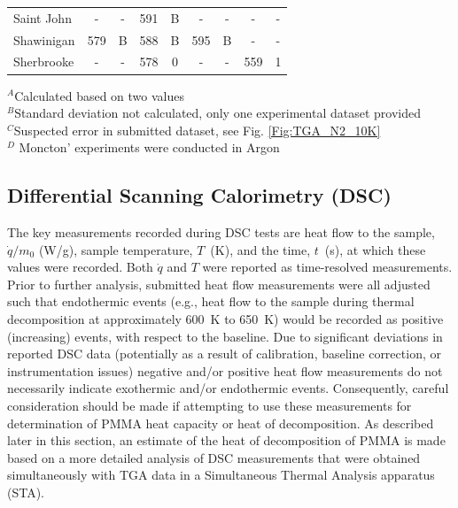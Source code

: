 \documentclass{book}
\begin{document}
\begin{table}[p]
\begin{center}
\begin{tabular}{|l|cc|cc|cc|cc|}
Saint John              & -           & -               & 591            & B                & -          & -                 & -           & -                     \\
Shawinigan              & 579         & B               & 588            & B                & 595        & B                 & -           & -                     \\
Sherbrooke              & -           & -               & 578            & 0                & -          & -                 & 559         & 1                     \\  \hline
\end{tabular}
\end{center}
$^A$Calculated based on two values \\
$^B$Standard deviation not calculated, only one experimental dataset provided \\
$^C$Suspected error in submitted dataset, see Fig. \ref{Fig:TGA_N2_10K} \\
$^D$ Moncton' experiments were conducted in Argon
\end{table}


\newpage
\subsection{Differential Scanning Calorimetry (DSC)}

The key measurements recorded during DSC tests are heat flow to the sample, $\dot{q}/m_0$ (W/g), sample temperature, $T$~(K), and the time, $t$~(s), at which these values were recorded.  Both $\dot{q}$ and $T$ were reported as time-resolved measurements. Prior to further analysis, submitted heat flow measurements were all adjusted such that endothermic events (e.g., heat flow to the sample during thermal decomposition at approximately 600~K to 650~K) would be recorded as positive (increasing) events, with respect to the baseline. Due to significant deviations in reported DSC data (potentially as a result of calibration, baseline correction, or instrumentation issues) negative and/or positive heat flow measurements do not necessarily indicate exothermic and/or endothermic events. Consequently, careful consideration should be made if attempting to use these measurements for determination of PMMA heat capacity or heat of decomposition. As described later in this section, an estimate of the heat of decomposition of PMMA is made based on a more detailed analysis of DSC measurements that were obtained simultaneously with TGA data in a Simultaneous Thermal Analysis apparatus (STA).
\end{document}
